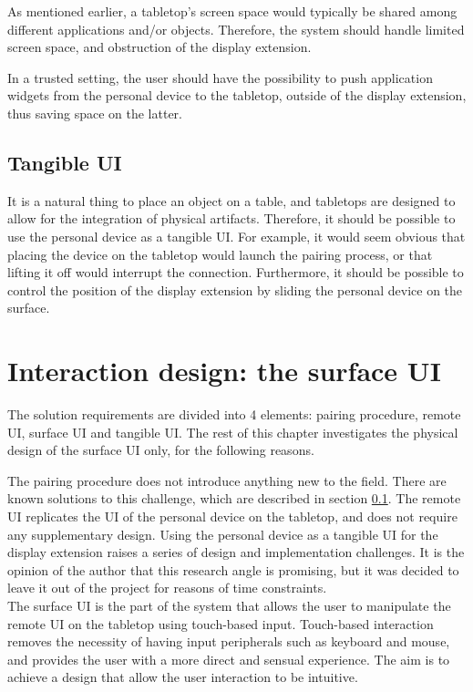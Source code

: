 As mentioned earlier, a tabletop's screen space would typically be shared among different applications and/or objects.
Therefore, the system should handle limited screen space, and obstruction of the display extension.

In a trusted setting, the user should have the possibility to push application widgets from the personal device to the tabletop, outside of the display extension, thus saving space on the latter.

\subsection{Tangible UI}

It is a natural thing to place an object on a table, and tabletops are designed to allow for the integration of physical artifacts.
Therefore, it should be possible to use the personal device as a tangible UI.
For example, it would seem obvious that placing the device on the tabletop would launch the pairing process, or that lifting it off would interrupt the connection.
Furthermore, it should be possible to control the position of the display extension by sliding the personal device on the surface.

\section{Interaction design: the surface UI}
\label{sec:interaction}

The solution requirements are divided into 4 elements: pairing procedure, remote UI, surface UI and tangible UI.
The rest of this chapter investigates the physical design of the surface UI only, for the following reasons.

The pairing procedure does not introduce anything new to the field. There are known solutions to this challenge, which are described in section \ref{}.
The remote UI replicates the UI of the personal device on the tabletop, and does not require any supplementary design.
Using the personal device as a tangible UI for the display extension raises a series of design and implementation challenges. It is the opinion of the author that this research angle is promising, but it was decided to leave it out of the project for reasons of time constraints.
\hfill\\
The surface UI is the part of the system that allows the user to manipulate the remote UI on the tabletop using touch-based input.
Touch-based interaction removes the necessity of having input peripherals such as keyboard and mouse, and provides the user with a more direct and sensual experience.
The aim is to achieve a design that allow the user interaction to be intuitive. 

